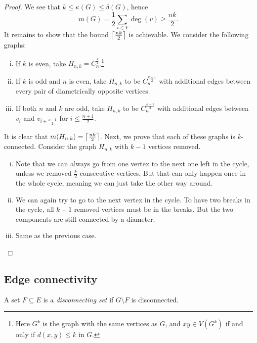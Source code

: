 \begin{proof}
We see that $k \leq \kappa(G) \leq \delta(G)$, hence
\[
m(G) =
\frac{1}{2} \sum_{v \in V} \deg(v) \geq
\frac{nk}{2}.
\]
It remains to show that the bound $\left\lceil \frac{nk}{2}\right\rceil$ is
achievable. We consider the following graphs:

\begin{enumerate}[i)]
\item If $k$ is even, take
$H_{n,k} = C_n^{\frac{k}{2}}$.\footnote{Here $G^k$ is the graph
with the same vertices as $G$, and $xy \in V(G^k)$ if and only if
$d(x,y) \leq k$ in $G$.}
\item If $k$ is odd and $n$ is even, take $H_{n,k}$ to be
$C_n^{\frac{k-1}{2}}$ with additional edges between every pair of
diametrically opposite vertices.
\item If both $n$ and $k$ are odd, take $H_{n,k}$ to be
$C_n^{\frac{k-1}{2}}$ with additional edges between
$v_i$ and $v_{i+\frac{n-1}{2}}$ for $i \leq \frac{n+1}{2}$.
\end{enumerate}

It is clear that $m(H_{n,k}) = \left\lceil \frac{nk}{2}\right\rceil$. Next, we prove
that each of these graphs is $k$-connected. Consider the graph
$H_{n,k}$ with $k-1$ vertices removed.

\begin{enumerate}[i)]
\item Note that we can always go from one vertex to the next one
left in the cycle, unless we removed $\frac{k}{2}$ consecutive
vertices. But that can only happen once in the whole cycle, meaning
we can just take the other way around.

\item We can again try to go to the next vertex in the cycle. To
have two breaks in the cycle, all $k-1$ removed vertices must be in
the breaks. But the two components are still connected by a
diameter.

\item Same as the previous case. \qedhere
\end{enumerate}
\end{proof}

\newpage


\subsection{Edge connectivity}

\begin{definicija}
A set $F \subseteq E$ is a
\emph{disconnecting set} if
$G \setminus F$ is disconnected.
\end{definicija}

